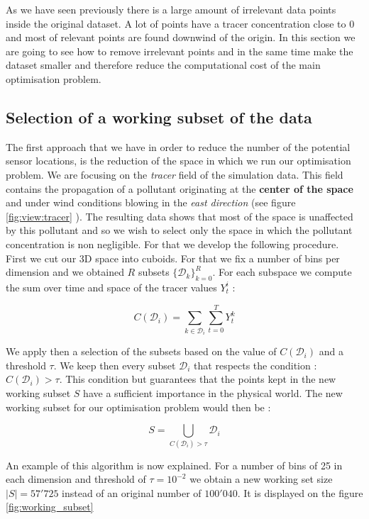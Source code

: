 As we have seen previously there is a large amount of irrelevant data points inside the original dataset. A lot of points have a tracer concentration close to $0$ and most of relevant points are found downwind of the origin. In this section we are going to see how to remove irrelevant points and in the same time make the dataset smaller and therefore reduce the computational cost of the main optimisation problem. 

\subsection{Selection of a working subset of the data}
The first approach that we have in order to reduce the number of the potential sensor locations, is the reduction of the space in which  we run our optimisation problem. We are focusing on the \textit{tracer} field of the simulation data. This field contains the propagation of a pollutant originating at the \textbf{center of the space} and under wind conditions blowing in the \textit{east direction} (see figure \ref{fig:view:tracer} ). The resulting data shows that most of the space is unaffected by this pollutant and so we wish to select only the space in which the pollutant concentration is non negligible. For that we develop the following procedure. \\

First we cut our 3D space into cuboids. For that we fix a number of bins per dimension and we obtained $R$ subsets $\{\mathcal{D}_k\}_{k=0}^R $. For each subspace we compute the sum over time and space of the tracer values $Y_t^i$  : 

\begin{equation}
	C(\mathcal{D}_i) = \sum_{k \in \mathcal{D}_i} \sum_{t = 0}^T Y_t^k
\end{equation}

We apply then a selection of the subsets based on the value of $C(\mathcal{D}_i)$ and a  threshold $\tau$. We keep then every subset $\mathcal{D}_i$ that respects the condition : $C(\mathcal{D}_i) > \tau$. This condition but guarantees that the points kept in the new working subset $S$ have a sufficient importance in the physical world. The new working subset for our optimisation problem would then be : 

\begin{equation}
	S = \bigcup_{C(\mathcal{D}_i) > \tau} \mathcal{D}_i
\end{equation} 

An example of this algorithm is now explained. For a number of bins of 25 in each dimension and threshold of $\tau = 10^{-2}$ we obtain a new working set size $|S| = 57'725$ instead of an original number of $100'040$. It is displayed on the figure \ref{fig:working_subset}


